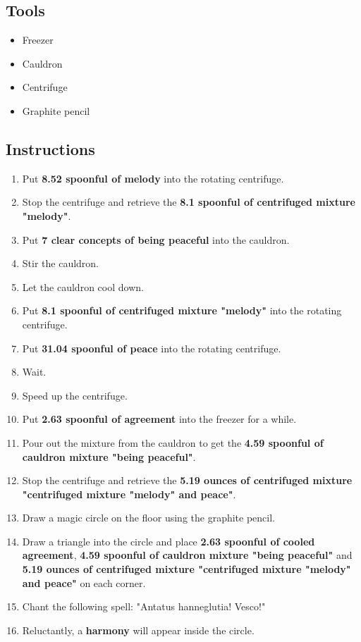 \documentclass{article}
\begin{document}
\subsection{Tools}\begin{itemize}
\item 
Freezer
\item 
Cauldron
\item 
Centrifuge
\item 
Graphite pencil
\end{itemize}
\subsection{Instructions}\begin{enumerate}
\item 
Put \textbf{8.52 spoonful of melody} into the rotating centrifuge.
\item 
Stop the centrifuge and retrieve the \textbf{8.1 spoonful of centrifuged mixture "melody"}.
\item 
Put \textbf{7 clear concepts of being peaceful} into the cauldron.
\item 
Stir the cauldron.
\item 
Let the cauldron cool down.
\item 
Put \textbf{8.1 spoonful of centrifuged mixture "melody"} into the rotating centrifuge.
\item 
Put \textbf{31.04 spoonful of peace} into the rotating centrifuge.
\item 
Wait.
\item 
Speed up the centrifuge.
\item 
Put \textbf{2.63 spoonful of agreement} into the freezer for a while.
\item 
Pour out the mixture from the cauldron to get the \textbf{4.59 spoonful of cauldron mixture "being peaceful"}.
\item 
Stop the centrifuge and retrieve the \textbf{5.19 ounces of centrifuged mixture "centrifuged mixture "melody" and peace"}.
\item 
Draw a magic circle on the floor using the graphite pencil.
\item 
Draw a triangle into the circle and place \textbf{2.63 spoonful of cooled agreement}, \textbf{4.59 spoonful of cauldron mixture "being peaceful"} and \textbf{5.19 ounces of centrifuged mixture "centrifuged mixture "melody" and peace"} on each corner.
\item 
Chant the following spell: "Antatus hanneglutia! Vesco!"
\item 
Reluctantly, a \textbf{harmony} will appear inside the circle.
\end{enumerate}
\newpage
\end{document}
